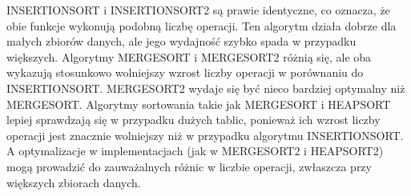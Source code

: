 \documentclass{article}
\begin{document}
	INSERTIONSORT i INSERTIONSORT2 są prawie identyczne, co oznacza, że obie funkcje wykonują podobną liczbę operacji. Ten algorytm działa dobrze dla małych zbiorów danych, ale jego wydajność szybko spada w przypadku większych. Algorytmy MERGESORT i MERGESORT2 różnią się, ale oba wykazują stosunkowo wolniejszy wzrost liczby operacji w porównaniu do INSERTIONSORT. MERGESORT2 wydaje się być nieco bardziej optymalny niż MERGESORT. Algorytmy sortowania takie jak MERGESORT i HEAPSORT lepiej sprawdzają się w przypadku dużych tablic, ponieważ ich wzrost liczby operacji jest znacznie wolniejszy niż w przypadku algorytmu INSERTIONSORT. A optymalizacje w implementacjach (jak w MERGESORT2 i HEAPSORT2) mogą prowadzić do zauważalnych różnic w liczbie operacji, zwłaszcza przy większych zbiorach danych.
\end{document}
